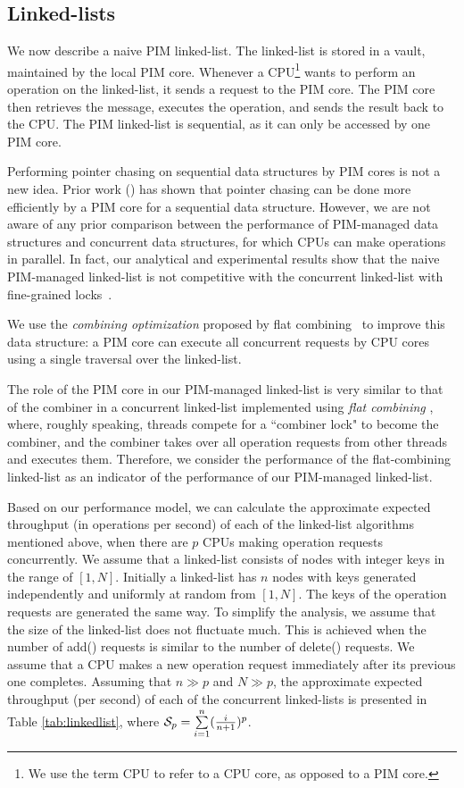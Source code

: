 \subsection{Linked-lists}
\label{section:linked_list}
We now describe a naive PIM linked-list.
The linked-list is stored in a vault, maintained by the local PIM core.
Whenever a CPU\footnote{We use the term CPU to refer to a CPU core, as opposed to a PIM core.} 
wants to perform an operation on the linked-list,
it sends a request to the PIM core.
The PIM core then retrieves the message, executes the operation, and sends the result back to the CPU.
The PIM linked-list is sequential, as it can only be accessed by one PIM core. 

Performing pointer chasing on sequential data structures by PIM cores is not a new idea. 
Prior work (\cite{hsieh2016accelerating, Ahn2015:2, Hashemi:2016}) has shown that 
pointer chasing can be done more efficiently by a PIM core for a sequential data structure.
However, we are not aware of any prior comparison between the performance of
PIM-managed data structures and concurrent data structures, 
for which CPUs can make operations in parallel.
In fact, our analytical and experimental results show that 
the naive PIM-managed linked-list is not competitive with 
the concurrent linked-list with fine-grained locks~\cite{Heller05}.

We use the \textit{combining optimization} proposed by 
flat combining~\cite{Hendler10} to improve this data structure:
a PIM core can execute all concurrent requests by CPU cores using a single 
traversal over the linked-list. 

The role of the PIM core in our PIM-managed linked-list
is very similar to that of the combiner in a concurrent linked-list implemented
using \textit{flat combining} \cite{Hendler10}, where, roughly speaking,
threads compete for a ``combiner lock" to become the combiner, and
the combiner takes over all operation requests from other threads and executes them.
Therefore, we consider the performance of the flat-combining linked-list as an indicator 
of the performance of our PIM-managed linked-list.

Based on our performance model, we can calculate the approximate expected throughput 
(in operations per second) of each of the linked-list algorithms mentioned above, 
when there are $p$ CPUs making operation requests concurrently.
We assume that a linked-list consists of nodes with integer keys in the range of $[1, N]$.
Initially a linked-list has $n$ nodes with keys generated independently
and uniformly at random from $[1, N]$.
The keys of the operation requests are generated the same way.
To simplify the analysis, we assume that the size of the linked-list does not fluctuate much. 
This is achieved when the number of add() requests is similar to the number of delete() requests. 
We assume that a CPU makes a new operation request immediately after
its previous one completes.
Assuming that $n \gg p$ and $N \gg p$, the approximate expected throughput (per second) of each
of the concurrent linked-lists is presented in Table \ref{tab:linkedlist}, 
where $\mathcal{S}_{p} = \sum\limits_{i=1}^{n} ({i \over n+1})^{p}$.

